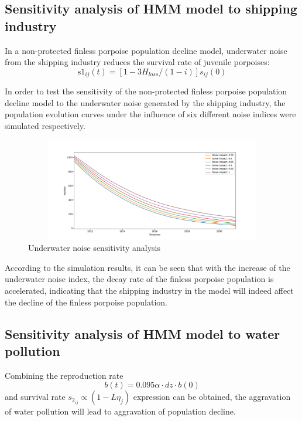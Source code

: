\documentclass[12pt]{article}  %
\begin{document}
\subsection{Sensitivity analysis of HMM model to shipping industry}
In a non-protected finless porpoise population decline model, underwater noise from the shipping industry reduces the survival rate of juvenile porpoises:
\begin{equation}
\text{s}{{\text{1}}_{i j}}(t)=\left[ 1-{3{{H}_{loss}}}/{(1-i)} \right]{{s}_{i j}}(0)
\end{equation}

In order to test the sensitivity of the non-protected finless porpoise population decline model to the underwater noise generated by the shipping industry, the population evolution curves under the influence of six different noise indices were simulated respectively.

\begin{figure}[htbp]%
	\small
	\centering
	\includegraphics[height=4.5cm,width=13cm]{figures/hear.png}%
	\caption{Underwater noise sensitivity analysis}%
\end{figure}

According to the simulation results, it can be seen that with the increase of the underwater noise index, the decay rate of the finless porpoise population is accelerated, indicating that the shipping industry in the model will indeed affect the decline of the finless porpoise population.
\subsection{Sensitivity analysis of HMM model to water pollution}
Combining the reproduction rate\[b(t)=0.095\alpha \cdot dz\cdot b(0)\] and survival rate $s_{{2}_{i j}}\propto (1 -L{{\eta }_{j}})$ expression can be obtained, the aggravation of water pollution will lead to aggravation of population decline.
\end{document}
